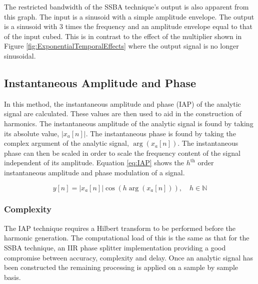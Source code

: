 			The restricted bandwidth of the SSBA technique's output is also apparent from this graph. The input
			is a sinusoid with a simple amplitude envelope. The output is a sinusoid with 3 times the frequency
			and an amplitude envelope equal to that of the input cubed. This is in contrast to the effect of
			the multiplier shown in Figure \ref{fig:ExponentialTemporalEffects} where the output signal is no
			longer sinusoidal.


	\subsection{Instantaneous Amplitude and Phase}
	\label{sec:Excitation-IAP}
		In this method, the instantaneous amplitude and phase (IAP) of the analytic signal are calculated. These
		values are then used to aid in the construction of harmonics. The instantaneous amplitude of the analytic
		signal is found by taking its absolute value, $|x_{a}[n]|$. The instantaneous phase is found by taking the
		complex argument of the analytic signal, $\arg(x_{a}[n])$. The instantaneous phase can then be scaled in
		order to scale the frequency content of the signal independent of its amplitude. Equation \ref{eq:IAP}
		shows the $h^{\text{th}}$ order instantaneous amplitude and phase modulation of a signal.

		\begin{equation}
			y[n] = |x_{a}[n]| \cos \left( h\arg(x_{a}[n]) \right), \quad h \in \mathbb{N}
			\label{eq:IAP}
		\end{equation}

		\subsubsection*{Complexity}
			The IAP technique requires a Hilbert transform to be performed before the harmonic generation. The
			computational load of this is the same as that for the SSBA technique, an IIR phase splitter
			implementation providing a good compromise between accuracy, complexity and delay. Once an analytic
			signal has been constructed the remaining processing is applied on a sample by sample basis. 
			
